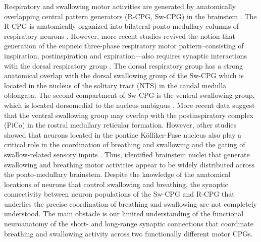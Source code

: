 \documentclass[pdflatex,sn-mathphys-ay]{sn-jnl}%
\theoremstyle{thmstyleone}%
\theoremstyle{thmstyletwo}%
\theoremstyle{thmstylethree}%
\begin{document}
Respiratory and swallowing motor activities are generated by anatomically overlapping central pattern generators (R-CPG, Sw-CPG) in the brainstem \citep{bianchi2009brainstem}. The R-CPG is anatomically organized into bilateral ponto-medullary columns of respiratory neurons \citep{alheid2004pontine}. However, more recent studies revived the notion that generation of the eupneic three-phase respiratory motor pattern--consisting of inspiration, postinspiration and expiration---also requires synaptic interactions with the dorsal respiratory group \citep{berger1977dorsal, hilaire1990functional, dhingra2019excitation, dhingra2019increasing, dhingra2020volumetric}. The dorsal respiratory group has a strong anatomical overlap with the dorsal swallowing group of the Sw-CPG which is located in the nucleus of the solitary tract (NTS) \citep{car1979inputs, kalia1980brain, kessler1985identification, jean2001brain} in the caudal medulla oblongata. The second compartment of Sw-CPG is the ventral swallowing group, which is located dorsomedial to the nucleus ambiguus \citep{kessler1985identification, ezure1993location, sugiyama2011axonal, fuse2019effects, huff2023role, toor2019neurons}. More recent data suggest that the ventral swallowing group may overlap with the postinspiratory complex (PiCo) \citep{toor2019neurons, pitts2021evidence, huff2023role} in the rostral medullary reticular formation. However, other studies showed that neurons located in the pontine K\"olliker-Fuse nucleus also play a critical role in the coordination of breathing and swallowing and the gating of swallow-related sensory inputs \citep{bautista2014ponto, takemura2022effect}. Thus, identified brainstem nuclei that generate swallowing and breathing motor activities appear to be widely distributed across the ponto-medullary brainstem. Despite the knowledge of the anatomical locations of neurons that control swallowing and breathing, the synaptic connectivity between neuron populations of the Sw-CPG and R-CPG that underlies the precise coordination of breathing and swallowing are not completely understood. The main obstacle is our limited understanding of the functional neuroanatomy of the short- and long-range synaptic connections that coordinate breathing and swallowing activity across two functionally different motor CPGs.
\end{document}
